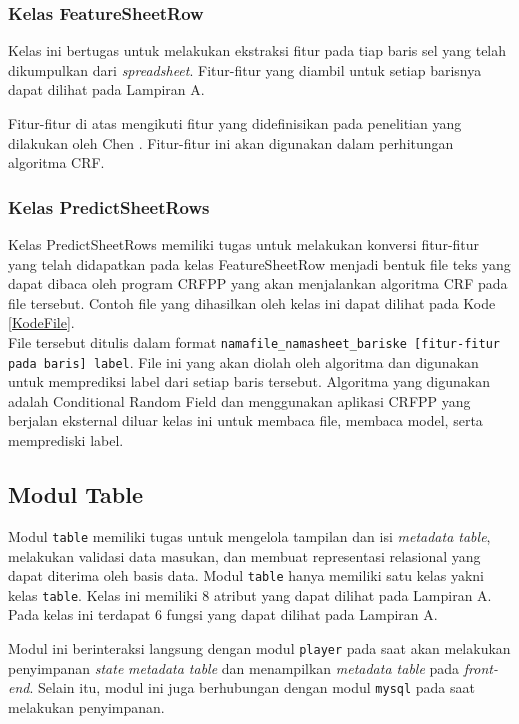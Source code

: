 \subsubsection{Kelas FeatureSheetRow}
Kelas ini bertugas untuk melakukan ekstraksi fitur pada tiap baris sel yang telah dikumpulkan dari \textit{spreadsheet}. Fitur-fitur yang diambil untuk setiap barisnya dapat dilihat pada Lampiran A.

Fitur-fitur di atas mengikuti fitur yang didefinisikan pada penelitian yang dilakukan oleh Chen \citep{Chen2013}. Fitur-fitur ini akan digunakan dalam perhitungan algoritma CRF.

\subsubsection{Kelas PredictSheetRows}
Kelas PredictSheetRows memiliki tugas untuk melakukan konversi fitur-fitur yang telah didapatkan pada kelas FeatureSheetRow menjadi bentuk file teks yang dapat dibaca oleh program CRFPP yang akan menjalankan algoritma CRF pada file tersebut. Contoh file yang dihasilkan oleh kelas ini dapat dilihat pada Kode \ref{KodeFile}.\\



File tersebut ditulis dalam format \texttt{namafile\_namasheet\_bariske [fitur-fitur pada baris] label}. File ini yang akan diolah oleh algoritma dan digunakan untuk memprediksi label dari setiap baris tersebut. Algoritma yang digunakan adalah Conditional Random Field dan menggunakan aplikasi CRFPP yang berjalan eksternal diluar kelas ini untuk membaca file, membaca model, serta memprediski label.

\subsection{Modul Table}
Modul \texttt{table} memiliki tugas untuk mengelola tampilan dan isi \textit{metadata table}, melakukan validasi data masukan, dan membuat representasi relasional yang dapat diterima oleh basis data. Modul \texttt{table} hanya memiliki satu kelas yakni kelas \texttt{table}. Kelas ini memiliki 8 atribut yang dapat dilihat pada Lampiran A.	Pada kelas ini terdapat 6 fungsi yang dapat dilihat pada Lampiran A.

Modul ini berinteraksi langsung dengan modul \texttt{player} pada saat akan melakukan penyimpanan \textit{state} \textit{metadata table} dan menampilkan \textit{metadata table} pada \textit{front-end}. Selain itu, modul ini juga berhubungan dengan modul \texttt{mysql} pada saat melakukan penyimpanan.

